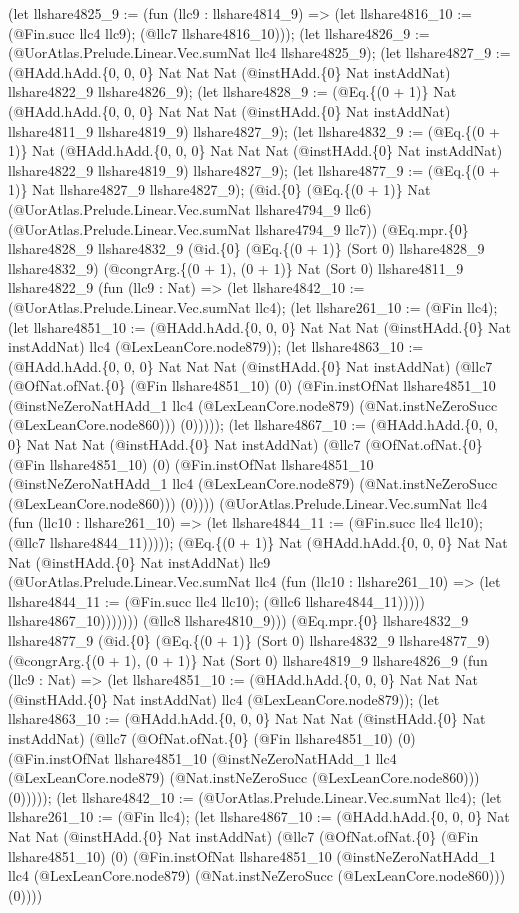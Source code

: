 \documentclass[11pt]{article}
\begin{document}
(let llshare4825\_9 := (fun (llc9 : llshare4814\_9) => (let llshare4816\_10 := (@Fin.succ llc4 llc9); (@llc7 llshare4816\_10))); (let llshare4826\_9 := (@UorAtlas.Prelude.Linear.Vec.sumNat llc4 llshare4825\_9); (let llshare4827\_9 := (@HAdd.hAdd.\{0, 0, 0\} Nat Nat Nat (@instHAdd.\{0\} Nat instAddNat) llshare4822\_9 llshare4826\_9); (let llshare4828\_9 := (@Eq.\{(0 + 1)\} Nat (@HAdd.hAdd.\{0, 0, 0\} Nat Nat Nat (@instHAdd.\{0\} Nat instAddNat) llshare4811\_9 llshare4819\_9) llshare4827\_9); (let llshare4832\_9 := (@Eq.\{(0 + 1)\} Nat (@HAdd.hAdd.\{0, 0, 0\} Nat Nat Nat (@instHAdd.\{0\} Nat instAddNat) llshare4822\_9 llshare4819\_9) llshare4827\_9); (let llshare4877\_9 := (@Eq.\{(0 + 1)\} Nat llshare4827\_9 llshare4827\_9); (@id.\{0\} (@Eq.\{(0 + 1)\} Nat (@UorAtlas.Prelude.Linear.Vec.sumNat llshare4794\_9 llc6) (@UorAtlas.Prelude.Linear.Vec.sumNat llshare4794\_9 llc7)) (@Eq.mpr.\{0\} llshare4828\_9 llshare4832\_9 (@id.\{0\} (@Eq.\{(0 + 1)\} (Sort 0) llshare4828\_9 llshare4832\_9) (@congrArg.\{(0 + 1), (0 + 1)\} Nat (Sort 0) llshare4811\_9 llshare4822\_9 (fun (llc9 : Nat) => (let llshare4842\_10 := (@UorAtlas.Prelude.Linear.Vec.sumNat llc4); (let llshare261\_10 := (@Fin llc4); (let llshare4851\_10 := (@HAdd.hAdd.\{0, 0, 0\} Nat Nat Nat (@instHAdd.\{0\} Nat instAddNat) llc4 (@LexLeanCore.node879)); (let llshare4863\_10 := (@HAdd.hAdd.\{0, 0, 0\} Nat Nat Nat (@instHAdd.\{0\} Nat instAddNat) (@llc7 (@OfNat.ofNat.\{0\} (@Fin llshare4851\_10) (0) (@Fin.instOfNat llshare4851\_10 (@instNeZeroNatHAdd\_1 llc4 (@LexLeanCore.node879) (@Nat.instNeZeroSucc (@LexLeanCore.node860))) (0))))); (let llshare4867\_10 := (@HAdd.hAdd.\{0, 0, 0\} Nat Nat Nat (@instHAdd.\{0\} Nat instAddNat) (@llc7 (@OfNat.ofNat.\{0\} (@Fin llshare4851\_10) (0) (@Fin.instOfNat llshare4851\_10 (@instNeZeroNatHAdd\_1 llc4 (@LexLeanCore.node879) (@Nat.instNeZeroSucc (@LexLeanCore.node860))) (0)))) (@UorAtlas.Prelude.Linear.Vec.sumNat llc4 (fun (llc10 : llshare261\_10) => (let llshare4844\_11 := (@Fin.succ llc4 llc10); (@llc7 llshare4844\_11))))); (@Eq.\{(0 + 1)\} Nat (@HAdd.hAdd.\{0, 0, 0\} Nat Nat Nat (@instHAdd.\{0\} Nat instAddNat) llc9 (@UorAtlas.Prelude.Linear.Vec.sumNat llc4 (fun (llc10 : llshare261\_10) => (let llshare4844\_11 := (@Fin.succ llc4 llc10); (@llc6 llshare4844\_11))))) llshare4867\_10))))))) (@llc8 llshare4810\_9))) (@Eq.mpr.\{0\} llshare4832\_9 llshare4877\_9 (@id.\{0\} (@Eq.\{(0 + 1)\} (Sort 0) llshare4832\_9 llshare4877\_9) (@congrArg.\{(0 + 1), (0 + 1)\} Nat (Sort 0) llshare4819\_9 llshare4826\_9 (fun (llc9 : Nat) => (let llshare4851\_10 := (@HAdd.hAdd.\{0, 0, 0\} Nat Nat Nat (@instHAdd.\{0\} Nat instAddNat) llc4 (@LexLeanCore.node879)); (let llshare4863\_10 := (@HAdd.hAdd.\{0, 0, 0\} Nat Nat Nat (@instHAdd.\{0\} Nat instAddNat) (@llc7 (@OfNat.ofNat.\{0\} (@Fin llshare4851\_10) (0) (@Fin.instOfNat llshare4851\_10 (@instNeZeroNatHAdd\_1 llc4 (@LexLeanCore.node879) (@Nat.instNeZeroSucc (@LexLeanCore.node860))) (0))))); (let llshare4842\_10 := (@UorAtlas.Prelude.Linear.Vec.sumNat llc4); (let llshare261\_10 := (@Fin llc4); (let llshare4867\_10 := (@HAdd.hAdd.\{0, 0, 0\} Nat Nat Nat (@instHAdd.\{0\} Nat instAddNat) (@llc7 (@OfNat.ofNat.\{0\} (@Fin llshare4851\_10) (0) (@Fin.instOfNat llshare4851\_10 (@instNeZeroNatHAdd\_1 llc4 (@LexLeanCore.node879) (@Nat.instNeZeroSucc (@LexLeanCore.node860))) (0)))) 
\end{document}
